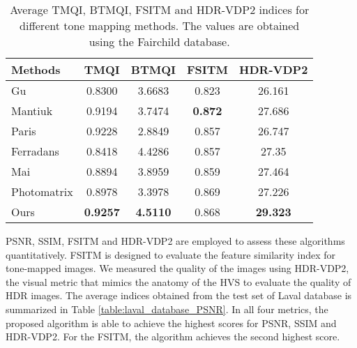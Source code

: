 \documentclass[journal]{IEEEtran}
\begin{document}
\begin{table}[tb]
\footnotesize
\begin{center}
\caption{Average TMQI, BTMQI, FSITM and HDR-VDP2 indices for different tone mapping methods. The values are obtained using the Fairchild database. }
\begin{tabular}{l|c|c|c|c}
\hline
 Methods & TMQI & BTMQI & FSITM & HDR-VDP2 \\ \hline
Gu \cite{gu2013local} & 0.8300 & 3.6683 &  0.823 & 26.161 \\
Mantiuk \cite{mantiuk2008display} & 0.9194 & 3.7474 & \textbf{0.872} & 27.686 \\
Paris \cite{paris2015local} & 0.9228 & 2.8849 & 0.857 & 26.747 \\
Ferradans \cite{ferradans2011analysis} & 0.8418 & 4.4286 & 0.857 & 27.35 \\
Mai \cite{mai2011optimizing} & 0.8894 & 3.8959 & 0.859 & 27.464 \\
Photomatrix \cite{photomatrix} & 0.8978 & 3.3978 & 0.869 & 27.226 \\
 Ours & \textbf{0.9257} & \textbf{4.5110} & 0.868 & \textbf{29.323} \\ \hline
\end{tabular}
\label{table:fairchild_metrices}
\end{center}
\end{table}

PSNR, SSIM, FSITM and HDR-VDP2 \cite{mantiuk2011hdr} are employed to assess these algorithms quantitatively. FSITM is designed to evaluate the feature similarity index for tone-mapped images.  We measured the quality of the images using HDR-VDP2, the visual metric that mimics the anatomy of the HVS to evaluate the quality of HDR images.  The average indices obtained from the test set of Laval database is summarized in Table \ref{table:laval_database_PSNR}. In all four metrics, the proposed algorithm is able to achieve the highest scores for PSNR, SSIM and HDR-VDP2. For the FSITM, the algorithm achieves the second highest score.   

\end{document}
